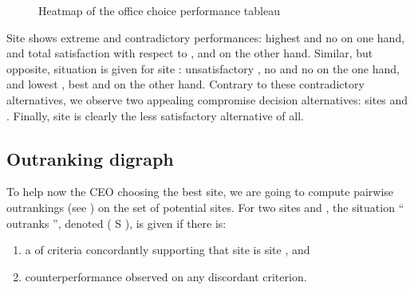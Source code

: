 \documentclass[a4paper,10pt,english]{sphinxhowto}
\let\sphinxpxdimen\pdfpxdimen\else\newdimen\sphinxpxdimen
\begin{document}
\begin{figure}[htbp]
\centering
\capstart

\noindent\sphinxincludegraphics[width=500\sphinxpxdimen]{{officeChoiceHeatmap}.png}
\caption{Heatmap of the office choice performance tableau}\label{\detokenize{tutorial:id125}}\end{figure}

Site  shows extreme and contradictory performances: highest  and no  on one hand, and total satisfaction with respect to ,  and  on the other hand. Similar, but opposite, situation is given for site : unsatisfactory , no  and no  on the one hand, and lowest , best  and  on the other hand. Contrary to these contradictory alternatives, we observe two appealing compromise decision alternatives: sites  and . Finally, site  is clearly the less satisfactory alternative of all.


\subsection{Outranking digraph}
\label{\detokenize{tutorial:id35}}
To help now the CEO choosing the best site, we are going to compute pairwise outrankings (see ) on the set of potential sites. For two sites  and , the situation “ outranks ”, denoted ( S ), is given if there is:
\begin{enumerate}
%
\item {} 
a  of criteria concordantly supporting that site  is  site , and

\item {} 
 counter\sphinxhyphen{}performance observed on any discordant criterion.

\end{enumerate}
\end{document}
